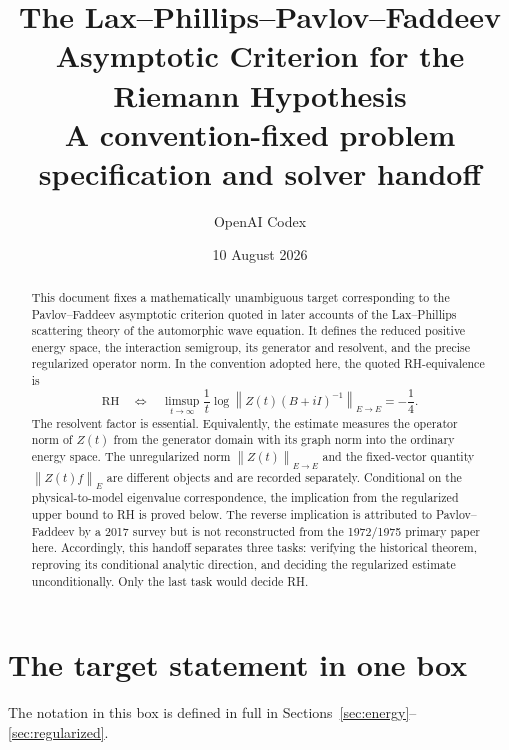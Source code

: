 \documentclass[11pt]{amsart}
\title{\bfseries The Lax--Phillips--Pavlov--Faddeev\\
Asymptotic Criterion for the Riemann Hypothesis\\[4pt]
\large A convention-fixed problem specification and solver handoff}
\author{OpenAI Codex}
\date{10 August 2026}
\theoremstyle{definition}
\theoremstyle{remark}
\newcommand{\norm}[1]{\left\lVert #1\right\rVert}
\begin{document}
\maketitle

\begin{abstract}
This document fixes a mathematically unambiguous target corresponding to the
Pavlov--Faddeev asymptotic criterion quoted in later accounts of the
Lax--Phillips scattering theory of the automorphic wave equation.  It defines
the reduced positive energy space, the interaction semigroup, its generator
and resolvent, and the precise regularized operator norm.  In the convention
adopted here, the quoted RH-equivalence is
\[
 \mathrm{RH}
 \quad\Longleftrightarrow\quad
 \limsup_{t\to\infty}\frac1t
 \log\norm{Z(t)(B+iI)^{-1}}_{E\to E}=-\frac14.
\]
The resolvent factor is essential.  Equivalently, the estimate measures the
operator norm of $Z(t)$ from the generator domain with its graph norm into the
ordinary energy space.  The unregularized norm $\norm{Z(t)}_{E\to E}$ and the
fixed-vector quantity $\norm{Z(t)f}_{E}$ are different objects and are recorded
separately.  Conditional on the physical-to-model eigenvalue correspondence,
the implication from the regularized upper bound to RH is proved below.  The
reverse implication is attributed to Pavlov--Faddeev by a 2017 survey but is
not reconstructed from the 1972/1975 primary paper here.  Accordingly, this
handoff separates three tasks: verifying the historical theorem, reproving its
conditional analytic direction, and deciding the regularized estimate
unconditionally.  Only the last task would decide RH.
\end{abstract}

\tableofcontents

\section{The target statement in one box}

The notation in this box is defined in full in Sections~\ref{sec:energy}--\ref{sec:regularized}.
\end{document}
